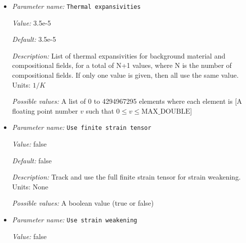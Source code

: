 \begin{itemize}
{\it Value:} 0.8e-6


{\it Default:} 0.8e-6


{\it Description:} List of thermal diffusivities, for background material and compositional fields, for a total of N+1 values, where N is the number of compositional fields. If only one value is given, then all use the same value.  Units: $m^2/s$


{\it Possible values:} A list of 0 to 4294967295 elements where each element is [A floating point number $v$ such that $0 \leq v \leq \text{MAX\_DOUBLE}$]
\item {\it Parameter name:} {\tt Thermal expansivities}
\label{parameters:Material model/Visco Plastic/Thermal expansivities}


{\it Value:} 3.5e-5


{\it Default:} 3.5e-5


{\it Description:} List of thermal expansivities for background material and compositional fields, for a total of N+1 values, where N is the number of compositional fields. If only one value is given, then all use the same value.  Units: $1 / K$


{\it Possible values:} A list of 0 to 4294967295 elements where each element is [A floating point number $v$ such that $0 \leq v \leq \text{MAX\_DOUBLE}$]
\item {\it Parameter name:} {\tt Use finite strain tensor}
\label{parameters:Material model/Visco Plastic/Use finite strain tensor}


{\it Value:} false


{\it Default:} false


{\it Description:} Track and use the full finite strain tensor for strain weakening. Units: None


{\it Possible values:} A boolean value (true or false)
\item {\it Parameter name:} {\tt Use strain weakening}
\label{parameters:Material model/Visco Plastic/Use strain weakening}


{\it Value:} false



\end{itemize}
